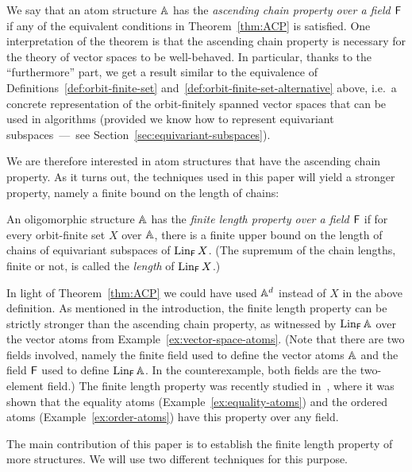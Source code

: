 We say that an atom structure $\mathbb{A}$ has the \emph{ascending chain property over a field $\mathsf{F}$} if any of the equivalent conditions in Theorem~\ref{thm:ACP} is satisfied. 
One interpretation of the theorem is that the ascending chain property is necessary for the theory of vector spaces to be well-behaved. 
In particular, thanks to the ``furthermore'' part, we get a result similar to the equivalence of Definitions~\ref{def:orbit-finite-set} and~\ref{def:orbit-finite-set-alternative} above, 
i.e.~a concrete representation of the orbit-finitely spanned vector spaces that can be used in algorithms (provided we know how to represent equivariant subspaces~---~see Section~\ref{sec:equivariant-subspaces}). 


We are therefore interested in atom structures that have the ascending chain property. 
As it turns out, the techniques used in this paper will yield a stronger property, namely a finite bound on the length of chains: 




\begin{definition}
    \label{def:finite-length-property}
    An oligomorphic structure $\mathbb{A}$ has the \emph{finite length property over a field $\mathsf{F}$} if for every orbit-finite set $X$ over $\mathbb{A}$, there is a finite upper bound on the length of chains of equivariant subspaces 
    of $\operatorname{Lin}_{\mathsf{F}} X$.
    (The supremum of the chain lengths, finite or not, is called the \emph{length} of $\operatorname{Lin}_{\mathsf{F}} X$.)
\end{definition}

In light of Theorem~\ref{thm:ACP} %
we could have used $\mathbb{A}^d$ instead of $X$ in the above definition.
As mentioned in the introduction, the finite length property can be strictly stronger than the ascending chain property, as witnessed by $\operatorname{Lin}_{\mathsf{F}} \mathbb{A}$ over the vector atoms from Example~\ref{ex:vector-space-atoms}. 
(Note that there are two fields involved, namely the finite field used to define the vector atoms $\mathbb{A}$ and the field $\mathsf{F}$ used to define $\operatorname{Lin}_{\mathsf{F}} \mathbb{A}$. 
In the counterexample, both fields are the two-element field.)
The finite length property was recently studied in~\cite{BFKM24}, where it was shown that the equality atoms (Example~\ref{ex:equality-atoms}) and the ordered atoms (Example~\ref{ex:order-atoms}) have this property over any field. 

The main contribution of this paper is to establish the finite length property of more structures. 
We will use two different techniques for this purpose.
